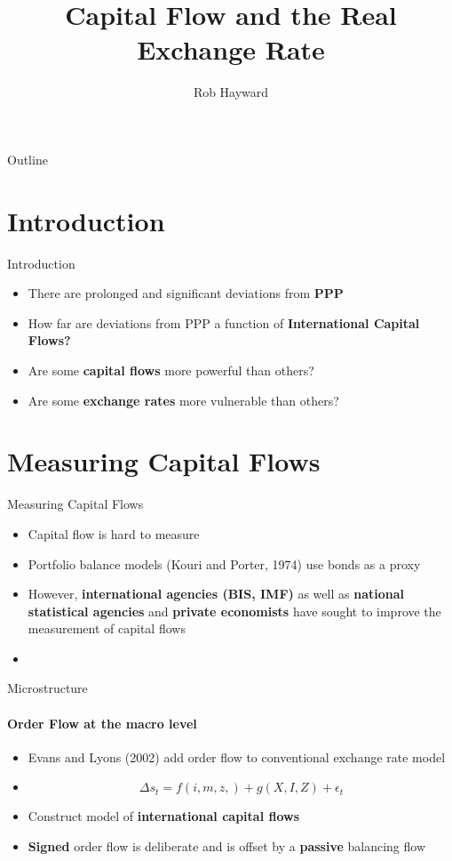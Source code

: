 \documentclass[14pt,xcolor=pdftex,dvipsnames,table]{beamer}
\title{Capital Flow and the Real Exchange Rate}
\author{Rob Hayward}
\begin{document}
\begin{frame}
\titlepage
\end{frame}

\begin{frame}{Outline}
\tableofcontents
\end{frame}

\section{Introduction}
\begin{frame}{Introduction}
\begin{itemize}[<+-| alert@+>]
\item There are prolonged and significant deviations from \textbf{PPP}
\item How far are deviations from PPP a function of \textbf{International Capital Flows?}
\item Are some \textbf{capital flows} more powerful than others? 
\item Are some \textbf{exchange rates} more vulnerable than others?  
\end{itemize}
\end{frame}

\section{Measuring Capital Flows}
\begin{frame}{Measuring Capital Flows}
\begin{itemize}[<+-| alert@+>]
\item Capital flow is hard to measure
\item Portfolio balance models (Kouri and Porter, 1974) use bonds as a proxy
\item However, \textbf{international agencies (BIS, IMF)} as well as \textbf {national statistical agencies} and \textbf{private economists} have sought to improve the measurement of capital flows
\item 
\end{itemize}
\end{frame}

\begin{frame}{Microstructure}
\framesubtitle{Order Flow at the macro level}
\begin{itemize}[<+-| alert@+>]
\item Evans and Lyons (2002) add order flow to conventional exchange rate model
\item \begin{equation}
 \Delta s_t=f(i,m,z,)+g(X,I,Z)+\epsilon_t
\end{equation}
\item Construct model of  \textbf{international capital flows} 
\item \textbf{Signed} order flow is deliberate and is offset by a \textbf{passive} balancing flow
\end{itemize}
\end{frame}
\end{document}
